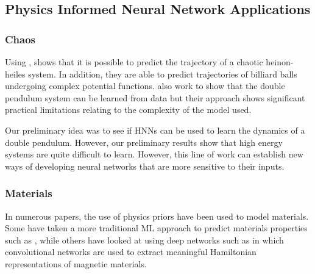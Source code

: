 \documentclass{article}
\begin{document}
\subsection{Physics Informed Neural Network Applications}


\subsubsection{Chaos}

Using , \cite{choudhary_physics_2019} shows that it is possible to predict the trajectory of a chaotic heinon-heiles system. In addition, they are able to predict trajectories of billiard balls undergoing complex potential functions. \cite{cranmer_lagrangian_2020} also work to show that the double pendulum system can be learned from data but their approach shows significant practical limitations relating to the complexity of the model used.

Our preliminary idea was to see if HNNs can be used to learn the dynamics of a double pendulum. However, our preliminary results show that high energy systems are quite difficult to learn. However, this line of work can establish new ways of developing neural networks that are more sensitive to their inputs. 


\subsubsection{Materials}

In numerous papers, \cite{rupp_fast_2012,witkoskie_neural_2005,pukrittayakamee_simultaneous_2009,smith_ani-1_2017,yao_tensormol-01_2018} the use of physics priors have been used to model materials. Some have taken a more traditional ML approach to predict materials properties such as \cite{rupp_fast_2012}, while others have looked at using deep networks such as \cite{wang_machine_2019} in which convolutional networks are used to extract meaningful Hamiltonian representations of magnetic materials.







\end{document}
